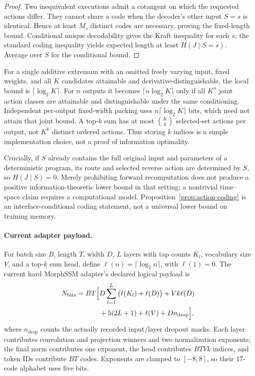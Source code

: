 \begin{proof}
Two inequivalent executions admit a cotangent on which the requested actions
differ. They cannot share a code when the decoder's other input $S=s$ is
identical. Hence at least $M_s$ distinct codes are necessary, proving the
fixed-length bound. Conditional unique decodability gives the Kraft
inequality for each $s$; the standard coding inequality yields expected
length at least $H(J\mid S=s)$. Average over $S$ for the conditional bound.
\end{proof}

For a single additive extremum with an omitted freely varying input, fixed
weights, and all $K$ candidates attainable and derivative-distinguishable,
the local bound is $\lceil\log_2K\rceil$. For $n$ outputs it becomes
$\lceil n\log_2K\rceil$ only if all $K^n$ joint action classes are attainable
and distinguishable under the same conditioning. Independent per-output
fixed-width packing uses $n\lceil\log_2K\rceil$ bits, which need not attain
that joint bound. A top-$k$ sum has at most $\binom{K}{k}$ selected-set actions
per output, not $K^k$ distinct ordered actions. Thus storing $k$ indices is a
simple implementation choice, not a proof of information optimality.

Crucially, if $S$ already contains the full original input and parameters of
a deterministic program, its route and selected reverse action are
determined by $S$, so $H(J\mid S)=0$. Merely prohibiting forward
recomputation does not produce a positive information-theoretic lower bound
in that setting; a nontrivial time--space claim requires a computational
model. Proposition~\ref{prop:action-coding} is an interface-conditional coding
statement, not a universal lower bound on training memory.

\paragraph{Current adapter payload.}
\label{app:payload}
For batch size $B$, length $T$, width $D$, $L$ layers with tap counts $K_l$,
vocabulary size $V$, and a top-$k$ sum head, define
$\ell(n)=\lceil\log_2n\rceil$, with $\ell(1)=0$. The current hard MorphSSM
adapter's declared logical payload is
\begin{align}
 N_{\mathrm{bits}}=BT\Big[&D\sum_{l=1}^{L}\big(\ell(K_l)+\ell(D)\big)
       +Vk\ell(D)\notag\\
       &+5(2L+1)+\ell(V)+Dn_{\mathrm{drop}}\Big],
 \label{eq:morphssm-logical-bits}
\end{align}
where $n_{\mathrm{drop}}$ counts the actually recorded input/layer dropout
masks. Each layer contributes convolution and projection winners and two
normalization exponents; the final norm contributes one exponent, the head
contributes $BT Vk$ indices, and token IDs contribute $BT$ codes. Exponents
are clamped to $[-8,8]$, so their 17-code alphabet uses five bits.

